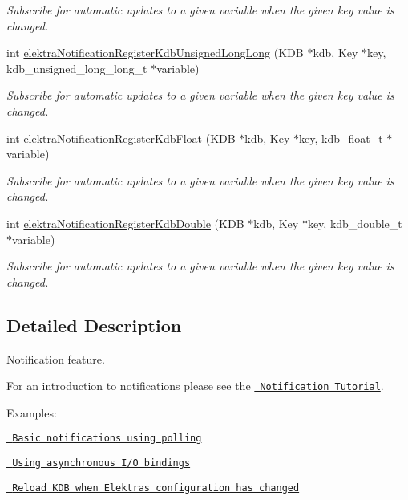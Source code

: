 \begin{DoxyCompactItemize}
\begin{DoxyCompactList}\small\item\em Subscribe for automatic updates to a given variable when the given key value is changed. \end{DoxyCompactList}\item 
int \mbox{\hyperlink{group__kdbnotification_gad375d4f6b35be2034bb3fa86ca5d8b49}{elektra\+Notification\+Register\+Kdb\+Unsigned\+Long\+Long}} (K\+DB $\ast$kdb, Key $\ast$key, kdb\+\_\+unsigned\+\_\+long\+\_\+long\+\_\+t $\ast$variable)
\begin{DoxyCompactList}\small\item\em Subscribe for automatic updates to a given variable when the given key value is changed. \end{DoxyCompactList}\item 
int \mbox{\hyperlink{group__kdbnotification_ga6c83faa92467ece80470e7898dc7d08b}{elektra\+Notification\+Register\+Kdb\+Float}} (K\+DB $\ast$kdb, Key $\ast$key, kdb\+\_\+float\+\_\+t $\ast$variable)
\begin{DoxyCompactList}\small\item\em Subscribe for automatic updates to a given variable when the given key value is changed. \end{DoxyCompactList}\item 
int \mbox{\hyperlink{group__kdbnotification_ga99a142068ed614d7cb8b177e3b6920e4}{elektra\+Notification\+Register\+Kdb\+Double}} (K\+DB $\ast$kdb, Key $\ast$key, kdb\+\_\+double\+\_\+t $\ast$variable)
\begin{DoxyCompactList}\small\item\em Subscribe for automatic updates to a given variable when the given key value is changed. \end{DoxyCompactList}\end{DoxyCompactItemize}


\subsection{Detailed Description}
Notification feature. 

For an introduction to notifications please see the \href{doc_tutorials_notifications_md.html}{\texttt{ Notification Tutorial}}.

Examples\+:


\begin{DoxyItemize}
\item \href{https://www.libelektra.org/examples/notificationpolling}{\texttt{ Basic notifications using polling}}
\item \href{https://www.libelektra.org/examples/notificationasync}{\texttt{ Using asynchronous I/O bindings}}
\item \href{https://www.libelektra.org/examples/notificationreload}{\texttt{ Reload K\+DB when Elektra\textquotesingle{}s configuration has changed}}
\end{DoxyItemize}

